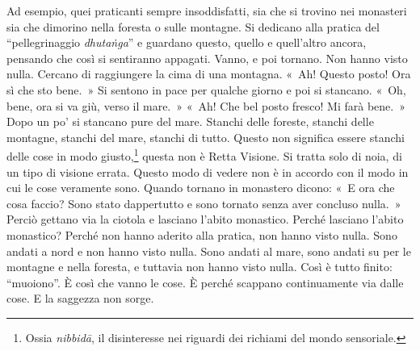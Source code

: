 Ad esempio, quei praticanti sempre insoddisfatti, sia che si trovino nei
monasteri sia che dimorino nella foresta o sulle montagne. Si dedicano
alla pratica del ``pellegrinaggio \emph{dhutaṅga}'' e guardano questo,
quello e quell'altro ancora, pensando che così si sentiranno appagati.
Vanno, e poi tornano. Non hanno visto nulla. Cercano di raggiungere la
cima di una montagna. «~Ah! Questo posto! Ora sì che sto bene.~» Si
sentono in pace per qualche giorno e poi si stancano. «~Oh, bene, ora si
va giù, verso il mare.~» «~Ah! Che bel posto fresco! Mi farà bene.~»
Dopo un po' si stancano pure del mare. Stanchi delle foreste, stanchi
delle montagne, stanchi del mare, stanchi di tutto. Questo non significa
essere stanchi delle cose in modo giusto,\footnote{Ossia \emph{nibbidā},
  il disinteresse nei riguardi dei richiami del mondo sensoriale.}
questa non è Retta Visione. Si tratta solo di noia, di un tipo di
visione errata. Questo modo di vedere non è in accordo con il modo in
cui le cose veramente sono. Quando tornano in monastero dicono: «~E ora
che cosa faccio? Sono stato dappertutto e sono tornato senza aver
concluso nulla.~» Perciò gettano via la ciotola e lasciano l'abito
monastico. Perché lasciano l'abito monastico? Perché non hanno aderito
alla pratica, non hanno visto nulla. Sono andati a nord e non hanno
visto nulla. Sono andati al mare, sono andati su per le montagne e nella
foresta, e tuttavia non hanno visto nulla. Così è tutto finito:
``muoiono''. È così che vanno le cose. È perché scappano continuamente
via dalle cose. E la saggezza non sorge.

